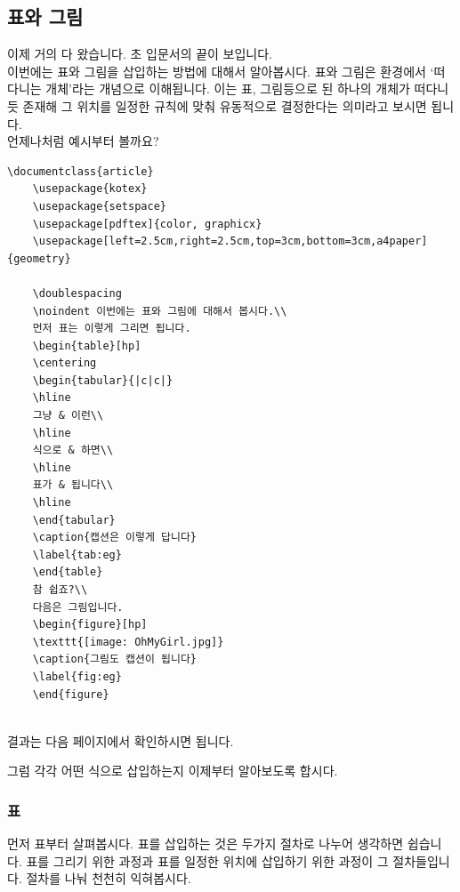 \newpage
\subsection{표와 그림}
\label{subsec:tabfig}
이제 거의 다 왔습니다. 초 입문서의 끝이 보입니다.\\
이번에는 표와 그림을 삽입하는 방법에 대해서 알아봅시다.
표와 그림은 \lt 환경에서 `떠다니는 개체'라는 개념으로 이해됩니다.
이는 표, 그림등으로 된 하나의 개체가 떠다니듯 존재해 그 위치를 일정한 규칙에 맞춰 유동적으로 결정한다는 의미라고 보시면 됩니다.\\
언제나처럼 예시부터 볼까요?

\begin{Verbatim}[frame=single]
	\documentclass{article}
	\usepackage{kotex}
	\usepackage{setspace}
	\usepackage[pdftex]{color, graphicx}
	\usepackage[left=2.5cm,right=2.5cm,top=3cm,bottom=3cm,a4paper]{geometry}
	
	\doublespacing
	\noindent 이번에는 표와 그림에 대해서 봅시다.\\
	먼저 표는 이렇게 그리면 됩니다.
	\begin{table}[hp]
	\centering
	\begin{tabular}{|c|c|}
	\hline
	그냥 & 이런\\
	\hline
	식으로 & 하면\\
	\hline
	표가 & 됩니다\\
	\hline
	\end{tabular}
	\caption{캡션은 이렇게 답니다}
	\label{tab:eg}
	\end{table}
	참 쉽죠?\\
	다음은 그림입니다.
	\begin{figure}[hp]
	\texttt{[image: OhMyGirl.jpg]}
	\caption{그림도 캡션이 됩니다}
	\label{fig:eg}
	\end{figure}
	
\end{Verbatim}

결과는 다음 페이지에서 확인하시면 됩니다.



그럼 각각 어떤 식으로 삽입하는지 이제부터 알아보도록 합시다.

\subsubsection{표}
\label{subsec:mktab}
먼저 표부터 살펴봅시다.
표를 삽입하는 것은 두가지 절차로 나누어 생각하면 쉽습니다.
표를 그리기 위한 과정과 표를 일정한 위치에 삽입하기 위한 과정이 그 절차들입니다.
절차를 나눠 천천히 익혀봅시다.

